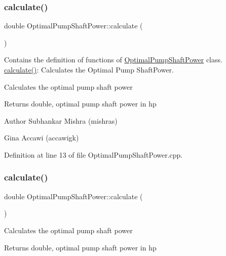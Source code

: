 \subsubsection{\texorpdfstring{calculate()}{calculate()}\hspace{0.1cm}{\footnotesize\ttfamily [1/3]}}
{\footnotesize\ttfamily double Optimal\+Pump\+Shaft\+Power\+::calculate (\begin{DoxyParamCaption}{ }\end{DoxyParamCaption})}



Contains the definition of functions of \hyperlink{class_optimal_pump_shaft_power}{Optimal\+Pump\+Shaft\+Power} class. \hyperlink{class_optimal_pump_shaft_power_a23ab040eea0a9e0431988bd353076237}{calculate()}\+: Calculates the Optimal Pump Shaft\+Power. 

Calculates the optimal pump shaft power

\begin{DoxyReturn}{Returns}
double, optimal pump shaft power in hp
\end{DoxyReturn}
\begin{DoxyAuthor}{Author}
Subhankar Mishra (mishras) 

Gina Accawi (accawigk) 
\end{DoxyAuthor}


Definition at line 13 of file Optimal\+Pump\+Shaft\+Power.\+cpp.

\mbox{\label{class_optimal_pump_shaft_power_a23ab040eea0a9e0431988bd353076237}} 
\subsubsection{\texorpdfstring{calculate()}{calculate()}\hspace{0.1cm}{\footnotesize\ttfamily [2/3]}}
{\footnotesize\ttfamily double Optimal\+Pump\+Shaft\+Power\+::calculate (\begin{DoxyParamCaption}{ }\end{DoxyParamCaption})}

Calculates the optimal pump shaft power

\begin{DoxyReturn}{Returns}
double, optimal pump shaft power in hp 
\end{DoxyReturn}
\mbox{\label{class_optimal_pump_shaft_power_a23ab040eea0a9e0431988bd353076237}} 
